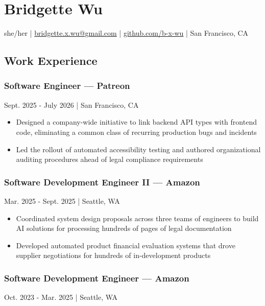 \documentclass[11pt, oneside]{article}
\begin{document}
\section{Bridgette Wu}

she/her | \href{mailto:bridgette.x.wu@gmail.com}{bridgette.x.wu@gmail.com} | \href{https://github.com/b-x-wu}{github.com/b-x-wu} | San Francisco, CA

\subsection{Work Experience}

\subsubsection{Software Engineer --- Patreon}
Sept. 2025 - July 2026 | San Francisco, CA

\begin{itemize}
\item Designed a company-wide initiative to link backend API types with frontend code, eliminating a common class of recurring production bugs and incidents

\item Led the rollout of automated accessibility testing and authored organizational auditing procedures ahead of legal compliance requirements
\end{itemize}

\subsubsection{Software Development Engineer II --- Amazon}
Mar. 2025 - Sept. 2025 | Seattle, WA

\begin{itemize}
\item Coordinated system design proposals across three teams of engineers to build AI solutions for processing hundreds of pages of legal documentation

\item Developed automated product financial evaluation systems that drove supplier negotiations for hundreds of in-development products
\end{itemize}

\subsubsection{Software Development Engineer --- Amazon}
Oct. 2023 - Mar. 2025 | Seattle, WA
\end{document}
